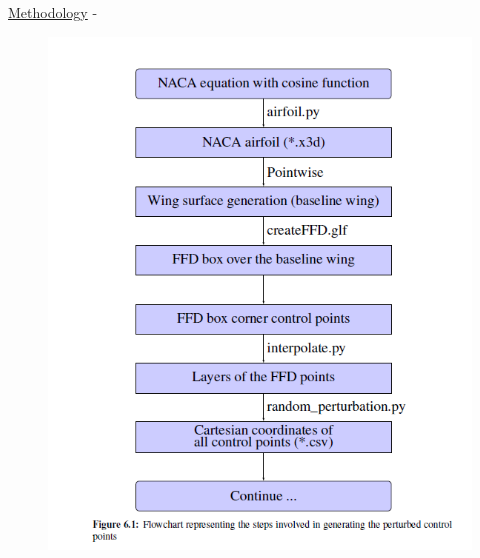 \begin{frame}[allowframebreaks]{\underline{Methodology} -}
{}
\parbox{0.4\linewidth}{
\begin{figure}  
    \centering
    \includegraphics[scale = 0.25]{figures/flow_chart_1.png}
\end{figure}
}
\parbox{0.45\linewidth}{
\begin{figure}  


\end{figure}}
\end{frame}
